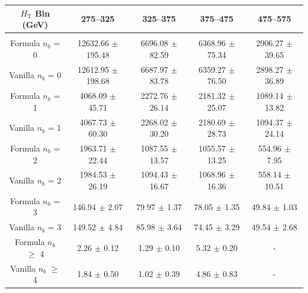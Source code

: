 \begin{table}[ht!]
\begin{center}
\footnotesize
\begin{tabular*}{0.95\textwidth}{@{\extracolsep{\fill}}ccccc}
\hline
$H_{\textrm{T}}$ Bin (GeV)         & 275--325                  & 325--375                  & 375--475                  & 475--575                 \\ 
\hline\hline
\\
Formula $n_{b}$ = 0                 & 12632.66  $\pm$  195.48   & 6696.08  $\pm$  82.59     & 6368.96  $\pm$  75.34     & 2906.27  $\pm$  39.65    \\
Vanilla $n_{b}$ = 0                 & 12612.95  $\pm$  198.68   & 6687.97  $\pm$  83.78     & 6359.27  $\pm$  76.50     & 2898.27  $\pm$  36.89    \\
\hline
Formula $n_{b}$ = 1                 & 4068.09  $\pm$  45.71     & 2272.76  $\pm$  26.14     & 2181.32  $\pm$  25.07     & 1089.14  $\pm$  13.82    \\
Vanilla $n_{b}$ = 1                 & 4067.73  $\pm$  60.30     & 2268.02  $\pm$  30.20     & 2180.69  $\pm$  28.73     & 1094.37  $\pm$  24.14    \\
\hline
Formula $n_{b}$ = 2                  & 1963.71  $\pm$  22.44     & 1087.55  $\pm$  13.57     & 1055.57  $\pm$  13.25     & 554.96  $\pm$  7.95      \\
Vanilla $n_{b}$ = 2                  & 1984.53  $\pm$  26.19     & 1094.43  $\pm$  16.67     & 1068.96  $\pm$  16.36     & 558.14  $\pm$  10.51     \\
\hline
Formula $n_{b}$ = 3                  & 146.94  $\pm$  2.07       & 79.97  $\pm$  1.37        & 78.05  $\pm$  1.35        & 49.84  $\pm$  1.03       \\
Vanilla $n_{b}$ = 3                  & 149.52  $\pm$  4.84       & 85.98  $\pm$  3.64        & 74.45  $\pm$  3.29        & 49.54  $\pm$  2.68       \\
\hline
Formula $n_{b}$ $\geq$ 4             & 2.26  $\pm$  0.12         & 1.29  $\pm$  0.10         & 5.32  $\pm$  0.20         & -     \\ 
Vanilla $n_{b}$ $\geq$ 4             & 1.84  $\pm$  0.50         & 1.02  $\pm$  0.39         & 4.86  $\pm$  0.83       & -        \\ 


\end{tabular*}
\end{center}
\end{table}
